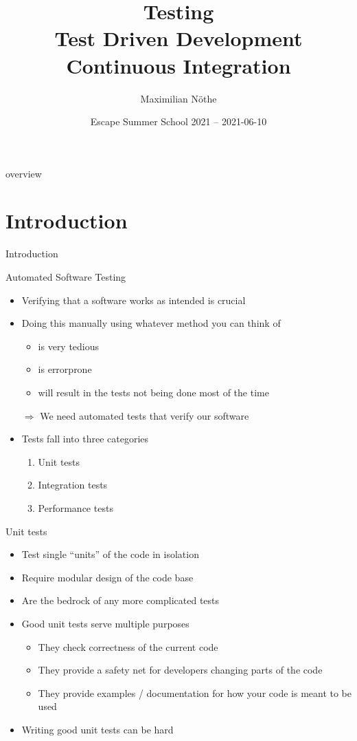 \documentclass[
  aspectratio=1610,
]{beamer}
\author[M. Nöthe]{Maximilian Nöthe}
\title[Testing]{Testing \\ Test Driven Development \\ Continuous Integration}
\date[2021-03-10]{Escape Summer School 2021 – 2021-06-10}
\institute[TU Dortmund]{Astroparticle Physics, TU Dortmund}
\newcommand\headlineframe[1]{%
  \begin{frame}[c]%
    \begin{center}%
      \Huge\color{vertexDarkRed}#1%
    \end{center}%
  \end{frame}%
}%
\begin{document}
\maketitle

\begin{frame}[c]{overview}
  \tableofcontents
\end{frame}

\section{Introduction}
\headlineframe{Introduction}

\begin{frame}[c]{Automated Software Testing}
  \begin{itemize}
    \item Verifying that a software works as intended is crucial
    \item Doing this manually using whatever method you can think of
      \begin{itemize}
        \item is very tedious
        \item is errorprone
        \item will result in the tests not being done most of the time
      \end{itemize}
    \item[$\Rightarrow$] We need automated tests that verify our software
    \item Tests fall into three categories
      \begin{enumerate}
        \item Unit tests
        \item Integration tests
        \item Performance tests
      \end{enumerate}
  \end{itemize}
\end{frame}

\begin{frame}[c]{Unit tests}
  \begin{itemize}
    \item Test single \enquote{units} of the code in isolation
    \item Require modular design of the code base
    \item Are the bedrock of any more complicated tests
    \item Good unit tests serve multiple purposes
      \begin{itemize}
        \item They check correctness of the current code
        \item They provide a safety net for developers changing parts of the code
        \item They provide examples / documentation for how your code is meant to be used
      \end{itemize}
    \item Writing good unit tests can be hard
  \end{itemize}
\end{frame}
\end{document}
